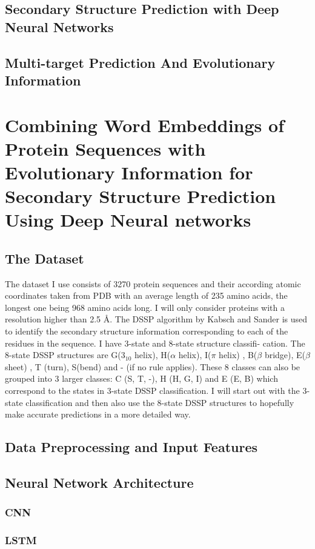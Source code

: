 \documentclass{article}
\begin{document}
\subsection{Secondary Structure Prediction with Deep Neural Networks}
\subsection{Multi-target Prediction And Evolutionary Information}

\section{Combining Word Embeddings of Protein Sequences with Evolutionary Information for Secondary Structure Prediction Using Deep Neural networks}
\subsection{The Dataset}
The dataset I use consists of 3270 protein sequences and their according
atomic coordinates taken from PDB with an average length of 235 amino acids,
the longest one being 968 amino acids long. I will only consider proteins with
a resolution higher than 2.5 Å. The DSSP algorithm by Kabsch and Sander
is used to identify the secondary structure information corresponding to each
of the residues in the sequence. I have 3-state and 8-state structure classifi-
cation. The 8-state DSSP structures are G($3_{10}$ helix), H($\alpha$ helix), I($\pi$ helix) ,
B($\beta$ bridge), E($\beta$ sheet) , T (turn), S(bend) and - (if no rule applies). These 8
classes can also be grouped into 3 larger classes: C (S, T, -), H (H, G, I) and E
(E, B) which correspond to the states in 3-state DSSP classification. I will start
out with the 3-state classification and then also use the 8-state DSSP structures
to hopefully make accurate predictions in a more detailed way.
\subsection{Data Preprocessing and Input Features}
\subsection{Neural Network Architecture}
\subsubsection{CNN}
\subsubsection{LSTM}
\end{document}
